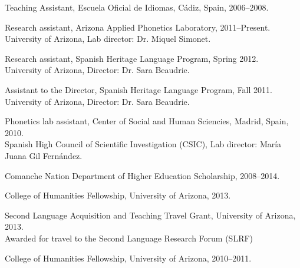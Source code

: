 \documentclass[11pt]{article}
\begin{document}
\noindent Teaching Assistant, Escuela Oficial de Idiomas, Cádiz, Spain, 2006--2008.


\bigskip
 

\medskip
\noindent Research assistant, Arizona Applied Phonetics Laboratory, 2011--Present. \\ 
University of Arizona, Lab director: Dr. Miquel Simonet. \\ \vspace{-0.1in}

\noindent Research assistant, Spanish Heritage Language Program, Spring 2012. \\ 
University of Arizona, Director: Dr. Sara Beaudrie. \\ \vspace{-0.1in}

\noindent Assistant to the Director, Spanish Heritage Language Program, Fall 2011. \\
University of Arizona, Director: Dr. Sara Beaudrie. \\ \vspace{-0.1in}

\noindent Phonetics lab assistant, Center of Social and Human Sciencies, Madrid, Spain, 2010. \\ 
Spanish High Council of Scientific Investigation (CSIC), Lab director: María Juana Gil Fernández.


\clearpage


\medskip
\noindent Comanche Nation Department of Higher Education Scholarship, 2008--2014. \\ \vspace{-0.1in} 

\noindent College of Humanities Fellowship, University of Arizona, 2013. \\ \vspace{-0.1in}

\noindent Second Language Acquisition and Teaching Travel Grant, University of Arizona, 2013. \\
Awarded for travel to the Second Language Research Forum (SLRF) \\ \vspace{-0.1in} 

\noindent College of Humanities Fellowship, University of Arizona, 2010--2011. \\ \vspace{-0.1in}
\end{document}
